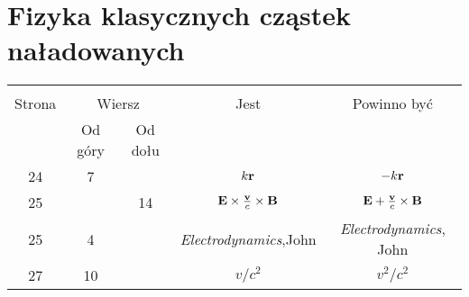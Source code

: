 \documentclass[a4paper,11pt]{article}
\begin{document}
\section{Fizyka klasycznych cząstek naładowanych}

\vspace{\spaceTwo}


















\begin{center}

  \begin{tabular}{|c|c|c|c|c|}
    \hline
    & \multicolumn{2}{c|}{} & & \\
    Strona & \multicolumn{2}{c|}{Wiersz} & Jest & Powinno być \\ \cline{2-3}
    & Od góry & Od dołu &  &  \\ \hline
    24 & 7 & & $k \mathbf{r}$ & $-k \mathbf{r}$ \\
    25 & & 14 & $\mathbf{E} \times \frac{ \mathbf{v} }{ c } \times \mathbf{B}$
           & $\mathbf{E} + \frac{ \mathbf{v} }{ c } \times \mathbf{B}$ \\
    25 & 4 & & \emph{Electrodynamics},John & \emph{Electrodynamics}, John \\
    27 & 10 & & $v / c^{ 2 }$ & $v^{ 2 } / c^{ 2 }$ \\
    \hline
  \end{tabular}

\end{center}


\vspace{\spaceTwo}











{}






\end{document}
